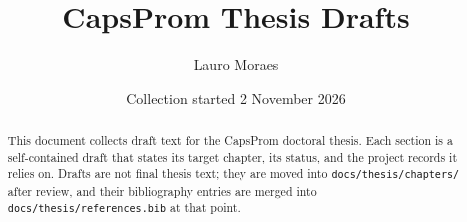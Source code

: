 \documentclass[11pt,a4paper]{article}
\title{CapsProm Thesis Drafts}
\author{Lauro Moraes}
\date{Collection started 2 November 2026}
\begin{document}
\maketitle

\begin{abstract}
This document collects draft text for the CapsProm doctoral thesis. Each
section is a self-contained draft that states its target chapter, its status,
and the project records it relies on. Drafts are not final thesis text; they
are moved into \texttt{docs/thesis/chapters/} after review, and their
bibliography entries are merged into \texttt{docs/thesis/references.bib} at
that point.
\end{abstract}

\tableofcontents








\end{document}
